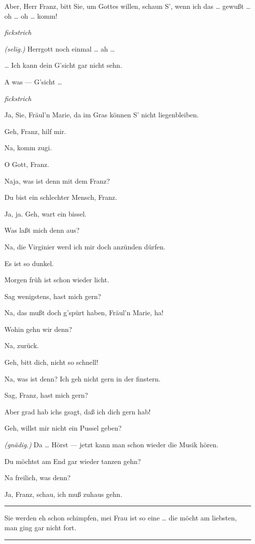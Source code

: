 \documentclass[
	final,
	a4paper,
	ngerman,
	mpinclude = true, %
	twoside = true,
	open = right,
	cleardoublepage = plain,
	DIV = 13,
	BCOR = 1cm,
	titlepage = firstiscover,
	]{scrbook}
\newcommand{\direction}[1]{\textit{(#1)}}
\newcommand{\hiat}{%
	\begin{center}
		\tiny
		\raisebox{0.5ex}{\rule{0.3\linewidth}{0.4pt}}
		\textit{fickstrich}
		\raisebox{0.5ex}{\rule{0.3\linewidth}{0.4pt}}
	\end{center}
}
\newenvironment{deletion}{%
		\vspace{0.25\baselineskip}
		\hrule
		\vspace{0.25\baselineskip}
		\color{darkgray}
	}{
		\color{black}
		\vspace{0.25\baselineskip}
		\hrule 
		\vspace{0.25\baselineskip}
	}
\newcommand{\thecharacter}[1]{\textup{\textsc{#1}}\xspace}
\newcommand{\thesoldat}{\thecharacter{Soldatin}}
\newcommand{\themaedchen}{\thecharacter{Praktikant}}
\newcommand{\character}[1]{\item[#1:]}
\newcommand{\soldat}{\character{\thesoldat}}
\newcommand{\maedchen}{\character{\themaedchen}}
\begin{document}
\begin{play}
	\maedchen
	Aber, Herr Franz, bitt Sie, um Gottes willen, schaun S', wenn ich das \ldots{} gewußt \ldots{} oh \ldots{} oh \ldots{} komm!

	\hiat

	\soldat
	\direction{selig.} Herrgott noch einmal \ldots{} ah \ldots{}

	\maedchen
	\ldots{} Ich kann dein G'sicht gar nicht sehn.

	\soldat
	A was --- G'sicht \ldots{}

	\hiat

	\soldat
	Ja, Sie, Fräul'n Marie, da im Gras können S' nicht liegenbleiben.

	\maedchen
	Geh, Franz, hilf mir.

	\soldat
	Na, komm zugi.

	\maedchen
	O Gott, Franz.

	\soldat
	Naja, was ist denn mit dem Franz?

	\maedchen
	Du bist ein schlechter Mensch, Franz.

	\soldat
	Ja, ja. Geh, wart ein bissel.

	\maedchen
	Was laßt mich denn aus?

	\soldat
	Na, die Virginier werd ich mir doch anzünden dürfen.

	\maedchen
	Es ist so dunkel.

	\soldat
	Morgen früh ist schon wieder licht.

	\maedchen
	Sag wenigstens, hast mich gern?

	\soldat
	Na, das mußt doch g'spürt haben, Fräul'n Marie, ha!

	\maedchen
	Wohin gehn wir denn?

	\soldat
	Na, zurück.

	\maedchen
	Geh, bitt dich, nicht so schnell!

	\soldat
	Na, was ist denn? Ich geh nicht gern in der finstern.

	\maedchen
	Sag, Franz, hast mich gern?

	\soldat
	Aber grad hab ichs gsagt, daß ich dich gern hab!

	\maedchen
	Geh, willst mir nicht ein Pussel geben?

	\soldat
	\direction{gnädig.} Da \ldots{} Hörst --- jetzt kann man schon wieder die Musik hören.

	\maedchen
	Du möchtst am End gar wieder tanzen gehn?

	\soldat
	Na freilich, was denn?

	\maedchen
	Ja, Franz, schau, ich muß zuhaus gehn.
	\begin{deletion}
		Sie werden eh schon schimpfen, mei Frau ist so eine \ldots{} die möcht am liebsten, man ging gar nicht fort.
	\end{deletion}


\end{play}
\end{document}
